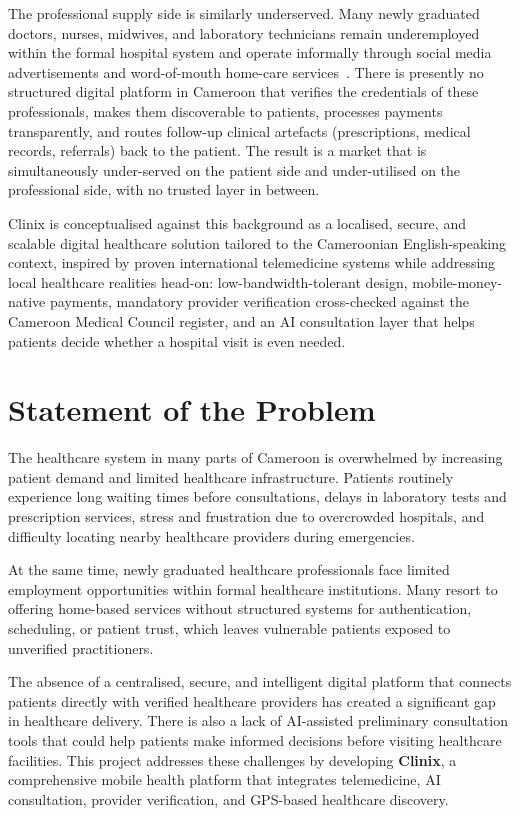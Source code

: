The professional supply side is similarly underserved. Many newly graduated doctors, nurses, midwives, and laboratory technicians remain underemployed within the formal hospital system and operate informally through social media advertisements and word-of-mouth home-care services~\cite{combi2016telemedicine}. There is presently no structured digital platform in Cameroon that verifies the credentials of these professionals, makes them discoverable to patients, processes payments transparently, and routes follow-up clinical artefacts (prescriptions, medical records, referrals) back to the patient. The result is a market that is simultaneously under-served on the patient side and under-utilised on the professional side, with no trusted layer in between.

Clinix is conceptualised against this background as a localised, secure, and scalable digital healthcare solution tailored to the Cameroonian English-speaking context, inspired by proven international telemedicine systems while addressing local healthcare realities head-on: low-bandwidth-tolerant design, mobile-money-native payments, mandatory provider verification cross-checked against the Cameroon Medical Council register, and an AI consultation layer that helps patients decide whether a hospital visit is even needed.

\section{Statement of the Problem}

The healthcare system in many parts of Cameroon is overwhelmed by increasing patient demand and limited healthcare infrastructure. Patients routinely experience long waiting times before consultations, delays in laboratory tests and prescription services, stress and frustration due to overcrowded hospitals, and difficulty locating nearby healthcare providers during emergencies.

At the same time, newly graduated healthcare professionals face limited employment opportunities within formal healthcare institutions. Many resort to offering home-based services without structured systems for authentication, scheduling, or patient trust, which leaves vulnerable patients exposed to unverified practitioners.

The absence of a centralised, secure, and intelligent digital platform that connects patients directly with verified healthcare providers has created a significant gap in healthcare delivery. There is also a lack of AI-assisted preliminary consultation tools that could help patients make informed decisions before visiting healthcare facilities. This project addresses these challenges by developing \textbf{Clinix}, a comprehensive mobile health platform that integrates telemedicine, AI consultation, provider verification, and GPS-based healthcare discovery.

